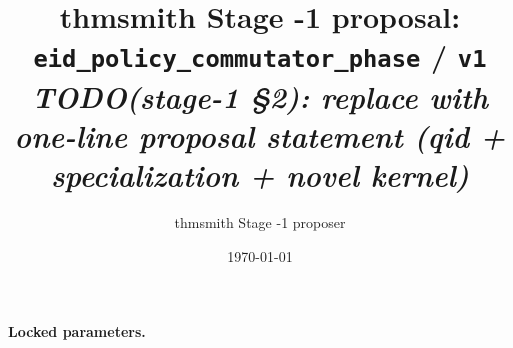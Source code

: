 \documentclass[11pt]{article}
\title{thmsmith Stage -1 proposal: \texttt{eid\_policy\_commutator\_phase} / \texttt{v1}%
  \\ \large\textit{TODO(stage-1 \S2): replace with one-line proposal statement (qid + specialization + novel kernel)}}
\author{thmsmith Stage -1 proposer}
\date{\today}
\theoremstyle{definition}
\theoremstyle{plain}
\theoremstyle{remark}
\begin{document}
\maketitle


\paragraph{Locked parameters.}

\begin{abstract}
\end{abstract}
\end{document}
